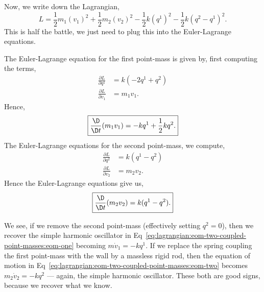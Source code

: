 Now, we write down the Lagrangian,
\begin{equation}
\boxed{L = \frac{1}{2}m_{1}(v_{1})^{2} + \frac{1}{2}m_{2}(v_{2})^{2}
- \frac{1}{2}k(q^{1})^{2} - \frac{1}{2}k(q^{2}-q^{1})^{2}.}
\end{equation}
This is half the battle, we just need to plug this into the
Euler-Lagrange equations.

The Euler-Lagrange equation for the first point-mass is given by, first
computing the terms,
\begin{subequations}
\begin{align}
\frac{\partial L}{\partial q^{1}} &= k (-2q^{1}+q^{2})\\
\frac{\partial L}{\partial v_{1}} &= m_{1}v_{1}.
\end{align}
\end{subequations}
Hence,
\begin{equation}\label{eq:lagrangian:eom-two-coupled-point-masses:eom-one}
\boxed{\frac{\D}{\D t}(m_{1}v_{1}) = -kq^{1} + \frac{1}{2}kq^{2}.}
\end{equation}
The Euler-Lagrange equations for the second point-mass, we compute,
\begin{subequations}
\begin{align}
\frac{\partial L}{\partial q^{2}} &= k (q^{1}-q^{2})\\
\frac{\partial L}{\partial v_{2}} &= m_{2}v_{2}.
\end{align}
\end{subequations}
Hence the Euler-Lagrange equations give us,
\begin{equation}\label{eq:lagrangian:eom-two-coupled-point-masses:eom-two}
\boxed{\frac{\D}{\D t}(m_{2}v_{2}) = k(q^{1} - q^{2}).}
\end{equation}

We see, if we remove the second point-mass (effectively setting
$q^{2}=0$), then we recover the simple harmonic oscillator
in Eq~\eqref{eq:lagrangian:eom-two-coupled-point-masses:eom-one}
becoming $m\dot{v}_{1} = -kq^{1}$. If we replace the spring coupling the
first point-mass with the wall by a massless rigid rod, then the
equation of motion in Eq~\eqref{eq:lagrangian:eom-two-coupled-point-masses:eom-two}
becomes $m_{2}\dot{v}_{2} = -kq^{2}$ --- again, the simple harmonic
oscillator. These both are good signs, because we recover what we know. 

